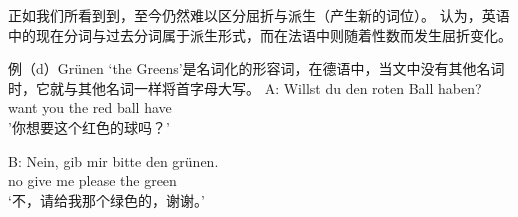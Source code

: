
正如我们所看到到，至今仍然难以区分屈折与派生（产生新的词位）。\citet*[--264]{SWB2003a} 认为，英语中的现在分词与过去分词属于派生形式，而在法语中则随着性数而发生屈折变化。

例（d）Grünen ‘the Greens’是名词化的形容词，在德语中，当文中没有其他名词时，它就与其他名词一样将首字母大写。
\ea
\gll A: Willst du den roten Ball haben?\\
	 {} want you the red ball have\\
\glt {} '你想要这个红色的球吗？'

\gll B: Nein, gib mir bitte den grünen.\\
	{} no give me please the green\\
\glt {} `不，请给我那个绿色的，谢谢。'
\z

